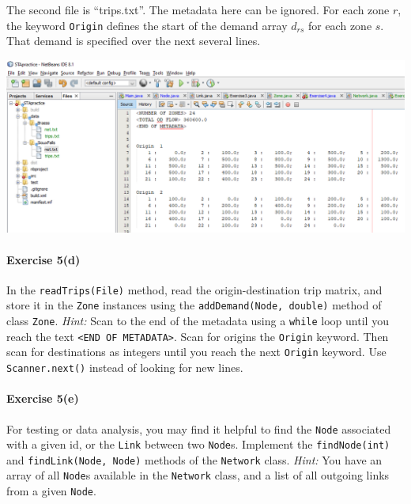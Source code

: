 \documentclass[12pt]{article}
\begin{document}
\vspace{\baselineskip}

\noindent
The second file is ``trips.txt''. The metadata here can be ignored. For each zone $r$, the keyword \texttt{Origin} defines the start of the demand array $d_{rs}$ for each zone $s$. That demand is specified over the next several lines.

\begin{center}
	\includegraphics[width=\textwidth]{netbeans7.png}
\end{center}

\paragraph*{Exercise 5(d)} In the \texttt{readTrips(File)} method, read the origin-destination trip matrix, and store it in the \texttt{Zone} instances using the \texttt{addDemand(Node, double)} method of class \texttt{Zone}. \textit{Hint:} Scan to the end of the metadata using a \texttt{while} loop until you reach the text \texttt{<END OF METADATA>}. Scan for origins the \texttt{Origin} keyword. Then scan for destinations as integers until you reach the next \texttt{Origin} keyword. Use \texttt{Scanner.next()} instead of looking for new lines. 


\paragraph*{Exercise 5(e)} For testing or data analysis, you may find it helpful to find the \texttt{Node} associated with a given id, or the \texttt{Link} between two \texttt{Node}s. Implement the \texttt{findNode(int)} and \texttt{findLink(Node, Node)} methods of the \texttt{Network} class. \textit{Hint:} You have an array of all \texttt{Node}s available in the \texttt{Network} class, and a list of all outgoing links from a given \texttt{Node}. 


 \vspace{\baselineskip}
\end{document}
